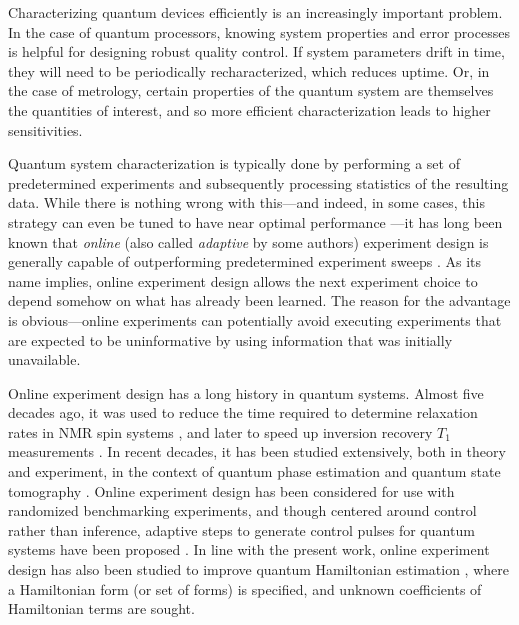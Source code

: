 \documentclass[aps,nofootinbib,twocolumn,superscriptaddress]{revtex4}
\begin{document}
Characterizing quantum devices efficiently is an increasingly
important problem.
In the case of quantum processors, knowing system properties
and error processes is helpful for designing robust quality control.
If system parameters drift in time, they will
need to be periodically recharacterized, which reduces uptime.
Or, in the case of metrology, certain properties of the quantum
system are themselves the quantities of interest, and so more efficient
characterization leads to higher sensitivities.

Quantum system characterization is typically done by performing
a set of predetermined experiments and subsequently processing
statistics of the resulting data.
While there is nothing wrong with this---and indeed, in some cases,
this strategy can even be tuned to have near optimal performance
\cite{chaloner_bayesian_1995,higgins_demonstrating_2009}---it
has long been known that \textit{online}
(also called \textit{adaptive} by some authors)
experiment design is generally
capable of outperforming predetermined experiment sweeps
\cite{chaloner_bayesian_1995}\citeneed.
As its name implies, online experiment design allows the next experiment
choice to depend somehow on what has already been learned.
The reason for the advantage is obvious---online
experiments can potentially avoid executing experiments that
are expected to be uninformative by using information that was
initially unavailable.

Online experiment design has a long history in quantum systems.
Almost five decades ago, it was used to reduce the time required to
determine relaxation rates in NMR spin systems \cite{freeman_adaptive_1972},
and later to speed up inversion recovery $T_1$ measurements
\cite{taitelbaum_two-stage_1993}.
In recent decades, it has been studied extensively, both in theory
and experiment, in the context of quantum phase estimation
\cite{
    wiseman_adaptive_1995,
    berry_optimal_2001,
    higgins_entanglement-free_2007,
    berry_how_2009,
    higgins_demonstrating_2009,
    xiang_entanglement-enhanced_2011,
    yonezawa_quantum-enhanced_2012,
    ciampini_quantum-enhanced_2016}
and quantum state tomography
\cite{
    huszar_adaptive_2012,
    kravtsov_experimental_2013,
    ferrie_self-guided_2014,
    stenberg_adaptive_2015,
    struchalin_experimental_2016,
    granade_practical_2016,
    qi_adaptive_2017}.
Online experiment design has been considered for use
with randomized benchmarking experiments\cite{granade_accelerated_2015},
and though centered around control rather than inference, adaptive steps
to generate control pulses for quantum systems have been proposed
\cite{egger_adaptive_2014,ferrie_robust_2015,rol_restless_2017}.
In line with the present work, online experiment design has also been
studied to improve quantum Hamiltonian estimation
\cite{
    sergeevich_characterization_2011,
    granade_robust_2012,
    ferrie_how_2013,
    wiebe_hamiltonian_2014,
    stenberg_simultaneous_2016,
    stenberg_characterization_2016},
where a Hamiltonian form (or set of forms) is specified, and
unknown coefficients of Hamiltonian terms are sought.
\end{document}
